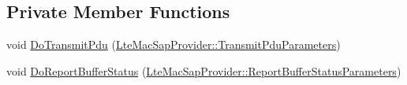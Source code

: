 \subsection*{Private Member Functions}
\begin{DoxyCompactItemize}
\item 
void \hyperlink{classns3_1_1LteTestMac_ac42464ac30381d3a1b2e88847f72fa21}{Do\+Transmit\+Pdu} (\hyperlink{structns3_1_1LteMacSapProvider_1_1TransmitPduParameters}{Lte\+Mac\+Sap\+Provider\+::\+Transmit\+Pdu\+Parameters})
\item 
void \hyperlink{classns3_1_1LteTestMac_a486658d7af3da936a6144b64ba159e69}{Do\+Report\+Buffer\+Status} (\hyperlink{structns3_1_1LteMacSapProvider_1_1ReportBufferStatusParameters}{Lte\+Mac\+Sap\+Provider\+::\+Report\+Buffer\+Status\+Parameters})
\end{DoxyCompactItemize}
